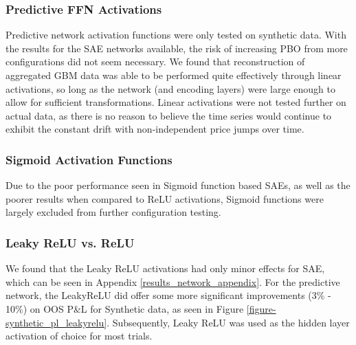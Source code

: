 \documentclass[a4paper,11pt,oneside]{article}
\theoremstyle{plain}
\theoremstyle{definition}
\begin{document}
	\subsubsection{Predictive FFN Activations}
	
	Predictive network activation functions were only tested on synthetic data. With the results for the SAE networks available, the risk of increasing PBO from more configurations did not seem necessary. We found that reconstruction of aggregated GBM data was able to be performed quite effectively through linear activations, so long as the network (and encoding layers) were large enough to allow for sufficient transformations. Linear activations were not tested further on actual data, as there is no reason to believe the time series would continue to exhibit the constant drift with non-independent price jumps over time. 
	
	\subsubsection{Sigmoid Activation Functions} 
	
	Due to the poor performance seen in Sigmoid function based SAEs, as well as the poorer results when compared to ReLU activations, Sigmoid functions were largely excluded from further configuration testing.
	
	\subsubsection{Leaky ReLU vs. ReLU}
	
	We found that the Leaky ReLU activations had only minor effects for SAE, which can be seen in Appendix \ref{results_network_appendix}. For the predictive network, the LeakyReLU did offer some more significant improvements (3\% - 10\%) on OOS P\&L for Synthetic data, as seen in Figure \ref{figure-synthetic_pl_leakyrelu}. Subsequently, Leaky ReLU was used as the hidden layer activation of choice for most trials.
	
\end{document}
